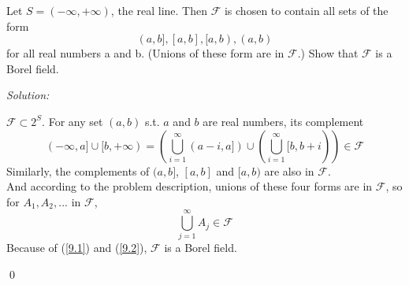 \documentclass[12pt]{article}
\newenvironment{problem}[2][Problem]{\begin{trivlist}
\item[\hskip \labelsep {\bfseries #1}\hskip \labelsep {\bfseries #2.}]}{\end{trivlist}}
\newenvironment{sol}
    {\emph{Solution:}
    }
    {
    \qed
    }
\begin{document}
\begin{problem}{9}
Let $S = (-\infty,+\infty)$, the real line. Then $\mathscr{F}$ is chosen to contain all sets of the form 
$$(a,b], [a,b], [a,b), (a,b)$$
for all real numbers a and b. (Unions of these form are in $\mathscr{F}$.) Show that  $\mathscr{F}$ is a Borel field.
\end{problem}
\begin{sol}
$\mathscr{F}\subset2^S$. For any set $(a,b)$ s.t. $a$ and $b$ are real numbers, its complement
\begin{equation}
\label{9.1}
(-\infty,a]\cup[b,+\infty)=(\bigcup_{i=1}^{\infty}(a-i,a])\cup(\bigcup_{i=1}^{\infty}[b,b+i))\in\mathscr{F}
\end{equation}
Similarly, the complements of $(a,b]$, $[a,b]$ and $[a,b)$ are also in $\mathscr{F}$.\\
And according to the problem description, unions of these four forms are in $\mathscr{F}$, so for $A_1,A_2, ...$ in $\mathscr{F}$,
\begin{equation}
\label{9.2}
\bigcup_{j=1}^{\infty}A_j\in\mathscr{F}
\end{equation}
Because of (\ref{9.1}) and (\ref{9.2}), $\mathscr{F}$ is a Borel field.
\end{sol}
\end{document}
